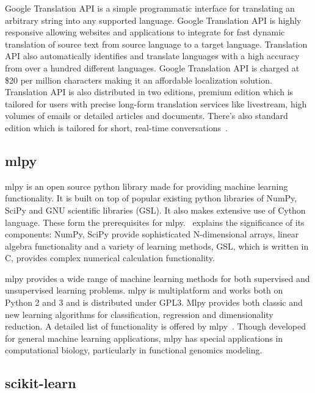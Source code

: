     Google Translation API is a simple programmatic interface for
    translating an arbitrary string into any supported
    language. Google Translation API is highly responsive allowing
    websites and applications to integrate for fast dynamic
    translation of source text from source language to a target
    language. Translation API also automatically identifies and
    translate languages with a high accuracy from over a hundred
    different languages.  Google Translation API is charged at \$20
    per million characters making it an affordable localization
    solution. Translation API is also distributed in two editions,
    premium edition which is tailored for users with precise long-form
    translation services like livestream, high volumes of emails or
    detailed articles and documents. There's also standard edition
    which is tailored for short, real-time
    conversations~\cite{www-translation}.

\subsection{mlpy }
    
mlpy is an open source python library made for providing machine
learning functionality. It is built on top of popular existing python
libraries of NumPy, SciPy and GNU scientific libraries (GSL). It also
makes extensive use of Cython language. These form the prerequisites
for mlpy.~\cite{DBLP:journals/corr/abs-1202-6548} explains the
significance of its components: NumPy, SciPy provide sophisticated
N-dimensional arrays, linear algebra functionality and a variety of
learning methods, GSL, which is written in C, provides complex
numerical calculation functionality.

mlpy provides a wide range of machine learning methods for both
supervised and unsupervised learning problems. mlpy is multiplatform
and works both on Python 2 and 3 and is distributed under GPL3. Mlpy
provides both classic and new learning algorithms for classification,
regression and dimensionality reduction. A detailed list of
functionality is offered by mlpy~\cite{www-mlpy}. Though developed for
general machine learning applications, mlpy has special applications
in computational biology, particularly in functional genomics
modeling.

    \pv

\subsection{scikit-learn}

